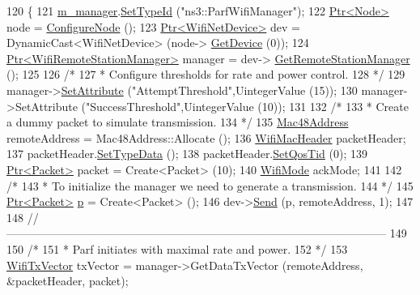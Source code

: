 \begin{DoxyCode}
120 \{
121   \hyperlink{classPowerRateAdaptationTest_afa9f7fb131c12b88efa24138930c50b3}{m\_manager}.\hyperlink{classns3_1_1ObjectFactory_a77dcd099064038a1eb7a6b8251229ec3}{SetTypeId} (\textcolor{stringliteral}{"ns3::ParfWifiManager"});
122   \hyperlink{classns3_1_1Ptr}{Ptr<Node>} node = \hyperlink{classPowerRateAdaptationTest_a498edc12eed6e91b38d1b71d4565a306}{ConfigureNode} ();
123   \hyperlink{classns3_1_1Ptr}{Ptr<WifiNetDevice>} dev = DynamicCast<WifiNetDevice> (node->
      \hyperlink{classns3_1_1Node_a5918dfd24ef632efc9a83a5f6561c76e}{GetDevice} (0));
124   \hyperlink{classns3_1_1Ptr}{Ptr<WifiRemoteStationManager>} manager = dev->
      \hyperlink{classns3_1_1WifiNetDevice_a8b8bb06504a6d76552dd626103b1e5fd}{GetRemoteStationManager} ();
125 
126   \textcolor{comment}{/*}
127 \textcolor{comment}{   * Configure thresholds for rate and power control.}
128 \textcolor{comment}{   */}
129   manager->\hyperlink{classns3_1_1ObjectBase_ac60245d3ea4123bbc9b1d391f1f6592f}{SetAttribute} (\textcolor{stringliteral}{"AttemptThreshold"},UintegerValue (15));
130   manager->SetAttribute (\textcolor{stringliteral}{"SuccessThreshold"},UintegerValue (10));
131 
132   \textcolor{comment}{/*}
133 \textcolor{comment}{   * Create a dummy packet to simulate transmission.}
134 \textcolor{comment}{   */}
135   \hyperlink{classns3_1_1Mac48Address}{Mac48Address} remoteAddress = Mac48Address::Allocate ();
136   \hyperlink{classns3_1_1WifiMacHeader}{WifiMacHeader} packetHeader;
137   packetHeader.\hyperlink{classns3_1_1WifiMacHeader_a8bc4915d867ea16df7c110a87c534c27}{SetTypeData} ();
138   packetHeader.\hyperlink{classns3_1_1WifiMacHeader_a84a98932f5b66cca86bdfaa9cb1bcf7b}{SetQosTid} (0);
139   \hyperlink{classns3_1_1Ptr}{Ptr<Packet>} packet = Create<Packet> (10);
140   \hyperlink{classns3_1_1WifiMode}{WifiMode} ackMode;
141 
142   \textcolor{comment}{/*}
143 \textcolor{comment}{   * To initialize the manager we need to generate a transmission.}
144 \textcolor{comment}{   */}
145   \hyperlink{classns3_1_1Ptr}{Ptr<Packet>} \hyperlink{lte__link__budget_8m_ac9de518908a968428863f829398a4e62}{p} = Create<Packet> ();
146   dev->\hyperlink{classns3_1_1WifiNetDevice_a14b6919a10da25e74e1c92554106b2c6}{Send} (p, remoteAddress, 1);
147 
148   \textcolor{comment}{//-----------------------------------------------------------------------------------------------------}
149 
150   \textcolor{comment}{/*}
151 \textcolor{comment}{   * Parf initiates with maximal rate and power.}
152 \textcolor{comment}{   */}
153   \hyperlink{classns3_1_1WifiTxVector}{WifiTxVector} txVector = manager->GetDataTxVector (remoteAddress, &packetHeader, packet);

\end{DoxyCode}
